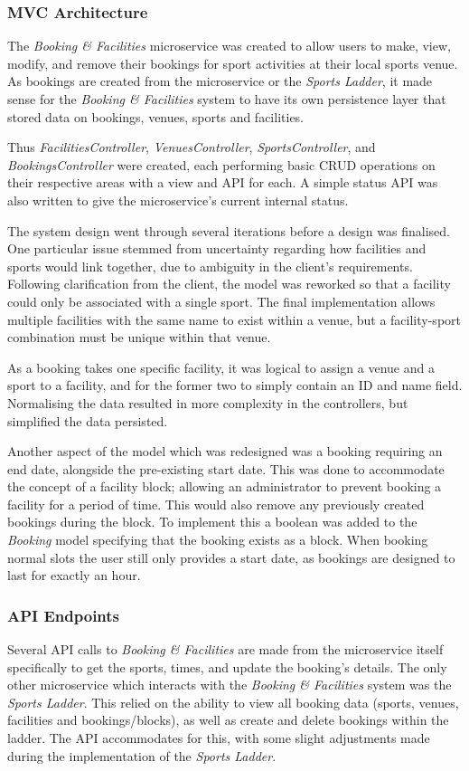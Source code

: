 \subsubsection{MVC Architecture}
\par
The \textit{Booking \& Facilities} microservice was created to allow users to make, view, modify, and remove their bookings for sport activities at their local sports venue. As bookings are created from the microservice or the \textit{Sports Ladder}, it made sense for the \textit{Booking \& Facilities} system to have its own persistence layer that stored data on bookings, venues, sports and facilities. 
\par
Thus \textit{FacilitiesController}, \textit{VenuesController}, \textit{SportsController},  and \textit{BookingsController} were created, each performing basic CRUD operations on their respective areas with a view and API for each. A simple status API was also written to give the microservice's current internal status. 
\par 
The system design went through several iterations before a design was finalised. One particular issue stemmed from uncertainty regarding how facilities and sports would link together, due to ambiguity in the client's requirements. Following clarification from the client, the model was reworked so that a facility could only be associated with a single sport. The final implementation allows multiple facilities with the same name to exist within a venue, but a facility-sport combination must be unique within that venue.
\par 
As a booking takes one specific facility, it was logical to assign a venue and a sport to a facility, and for the former two to simply contain an ID and name field. Normalising the data resulted in more complexity in the controllers, but simplified the data persisted.
\par
Another aspect of the model which was redesigned was a booking requiring an end date, alongside the pre-existing start date. This was done to accommodate the concept of a facility block; allowing an administrator to prevent booking a facility for a period of time. This would also remove any previously created bookings during the block. To implement this a boolean was added to the \textit{Booking} model specifying that the booking exists as a block. When booking normal slots the user still only provides a start date, as bookings are designed to last for exactly an hour.
\subsubsection{API Endpoints}
\par 
Several API calls to \textit{Booking \& Facilities} are made from the microservice itself specifically to get the sports, times, and update the booking's details. The only other microservice which interacts with the \textit{Booking \& Facilities} system was the \textit{Sports Ladder}. This relied on the ability to view all booking data (sports, venues, facilities and bookings/blocks), as well as create and delete bookings within the ladder. The API accommodates for this, with some slight adjustments made during the implementation of the \textit{Sports Ladder}. 
